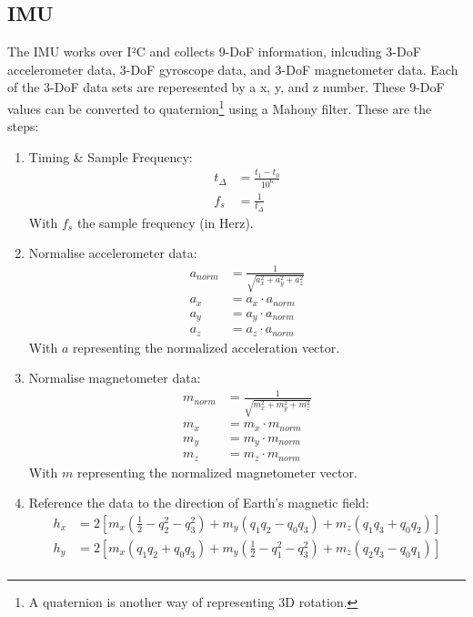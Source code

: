 \documentclass[ti,oneside,10pt]{uantwerpenreport}
\begin{document}
\subsection{IMU}
The IMU works over I²C and collects 9-DoF information, inlcuding 3-DoF accelerometer data, 3-DoF gyroscope data, and 3-DoF magnetometer data.
Each of the 3-DoF data sets are reperesented by a x, y, and z number.
These 9-DoF values can be converted to quaternion\footnote{A quaternion is another way of representing 3D rotation.} using a Mahony filter.
These are the steps:
\begin{enumerate}
    \item Timing & Sample Frequency:
        \begin{align}
            t_\Delta & = \frac{t_1 - t_0}{10^6} \\
            f_s      & = \frac{1}{t_\Delta}
        \end{align}
        With $f_s$ the sample frequency (in Herz).
    \item Normalise accelerometer data:
        \begin{align}
            a_{norm} & = \frac{1}{\sqrt{a_x^2 + a_y^2 + a_z^2}} \\
            a_x      & = a_x \cdot a_{norm} \\
            a_y      & = a_y \cdot a_{norm} \\
            a_z      & = a_z \cdot a_{norm}
        \end{align}
        With $a$ representing the normalized acceleration vector.
    \item Normalise magnetometer data:
        \begin{align}
            m_{norm} & = \frac{1}{\sqrt{m_x^2 + m_y^2 + m_z^2}}\\
            m_x      & = m_x \cdot m_{norm} \\
            m_y      & = m_y \cdot m_{norm} \\
            m_z      & = m_z \cdot m_{norm}
        \end{align}
        With $m$ representing the normalized magnetometer vector.
    \item Reference the data to the direction of Earth's magnetic field:
        \begin{align}
            h_x &= 2\!\left[m_x\!\left(\tfrac{1}{2} - q_2^2 - q_3^2\right) + m_y(q_1 q_2 - q_0 q_3) + m_z(q_1 q_3 + q_0 q_2)\right] \\
            h_y &= 2\!\left[m_x(q_1 q_2 + q_0 q_3) + m_y\!\left(\tfrac{1}{2} - q_1^2 - q_3^2\right) + m_z(q_2 q_3 - q_0 q_1)\right] \\

\end{align}
\end{enumerate}
\end{document}
